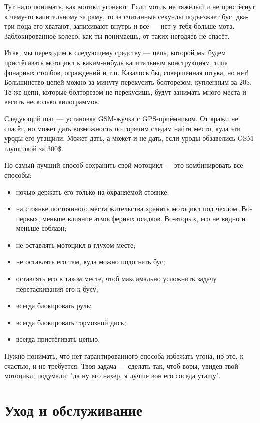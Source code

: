 \documentclass[12pt,a4paper]{article}
\begin{document}
Тут надо понимать, как
мотики угоняют. Если мотик не тяжёлый и не пристёгнут к чему-то
капитальному за раму, то за считанные секунды подъезжает бус, два-три
поца его хватают, запихивают внутрь и всё --- нет у тебя больше мота.
Заблокированное колесо, как ты понимаешь, от таких негодяев не спасёт.

Итак, мы переходим к следующему средству --- цепь, которой мы будем
пристёгивать мотоцикл к каким-нибудь капитальным конструкциям, типа
фонарных столбов, ограждений и т.п. Казалось бы, совершенная штука,
но нет! Большинство цепей можно за минуту перекусить болторезом,
купленным за 20\$. Те же цепи, которые болторезом не перекусишь, будут
занимать много места и весить несколько килограммов.

Следующий шаг --- установка GSM-жучка с GPS-приёмником. От кражи не
спасёт, но может дать возможность по горячим следам найти место,
куда эти уроды его утащили. Может дать, а может и не дать, если уроды
обзавелись GSM-глушилкой за 300\$.

Но самый лучший способ сохранить свой мотоцикл --- это комбинировать все
способы:

\begin{itemize}
\item ночью держать его только на охраняемой стоянке;
\item на стоянке постоянного места жительства хранить мотоцикл под чехлом.
Во-первых, меньше влияние атмосферных осадков. Во-вторых, его не видно и
меньше соблазн;
\item не оставлять мотоцикл в глухом месте;
\item не оставлять его там, куда можно подогнать бус;
\item оставлять его в таком месте, чтоб максимально усложнить задачу
перетаскивания его к бусу;
\item всегда блокировать руль;
\item всегда блокировать тормозной диск;
\item всегда пристёгивать цепью.
\end{itemize}

Нужно понимать, что нет гарантированного способа избежать угона, но это,
к счастью, и не требуется. Твоя задача --- сделать так, чтоб воры, увидев
твой мотоцикл, подумали: "да ну его нахер, я лучше вон его соседа утащу".

\section{Уход и обслуживание}
\end{document}
